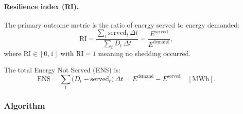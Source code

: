 \paragraph{Resilience index (RI).}
The primary outcome metric is the ratio of energy served to energy demanded:
\begin{equation}
  \mathrm{RI} = \frac{\sum_t \text{served}_t\,\Delta t}
                     {\sum_t D_t\,\Delta t}
             = \frac{E^{\text{served}}}{E^{\text{demand}}},
  \label{eq:resilience-index}
\end{equation}
where $\mathrm{RI}\in[0,1]$ with $\mathrm{RI}=1$ meaning no shedding occurred.

The total Energy Not Served (ENS) is:
\begin{equation}
  \mathrm{ENS} = \sum_t \bigl(D_t - \text{served}_t\bigr)\,\Delta t
              = E^{\text{demand}} - E^{\text{served}} \quad [\text{MWh}].
  \label{eq:res-ens}
\end{equation}

\subsubsection{Algorithm}
\label{sec:resilience-alg}

